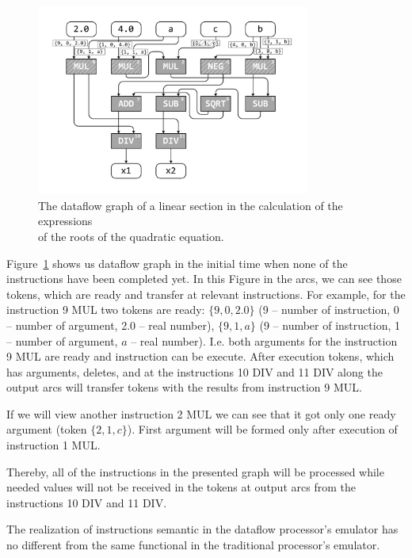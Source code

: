 \documentclass[
11pt,%
tightenlines,%
twoside,%
onecolumn,%
nofloats,%
nobibnotes,%
nofootinbib,%
superscriptaddress,%
noshowpacs,%
centertags]%
{revtex4}
\begin{document}
\begin{figure}[h]
\setcaptionmargin{5mm}
\onelinecaptionsfalse %
\includegraphics[width=0.80\textwidth]{pics/dataflow.pdf}
\caption{The dataflow graph of a linear section in the calculation of the expressions \\ of the roots of the quadratic equation.}\label{fig:dataflow}
\end{figure}

Figure~\ref{fig:dataflow} shows us dataflow graph in the initial time when none of the instructions have been completed yet. In this Figure in the arcs, we can see those tokens, which are ready and transfer at relevant instructions. For example, for the instruction 9 MUL two tokens are ready: $\{9, 0, 2.0\}$ (9 -- number of instruction, 0 -- number of argument, 2.0 -- real number), $\{9, 1, a\}$ (9 -- number of instruction, 1 -- number of argument, $a$ -- real number). I.e. both arguments for the instruction 9 MUL are ready and instruction can be execute. After execution tokens, which has arguments, deletes, and at the instructions 10 DIV and 11 DIV along the output arcs will transfer tokens with the results from instruction 9 MUL.

If we will view another instruction 2 MUL we can see that it got only one ready argument (token $\{2, 1, c\}$). First argument will be formed only after execution of instruction 1 MUL.

Thereby, all of the instructions in the presented graph will be processed while needed values will not be received in the tokens at output arcs from the instructions 10 DIV and 11 DIV.

The realization of instructions semantic in the dataflow processor’s emulator has no different from the same functional in the traditional processor’s emulator.
\end{document}
